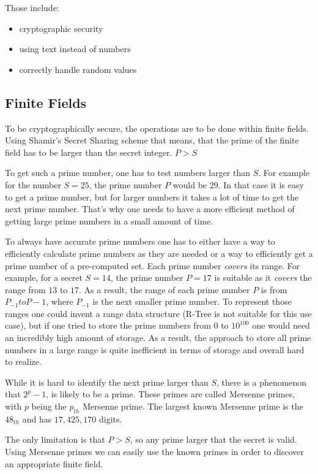 Those include:

\begin{itemize}
  \item cryptographic security
  \item using text instead of numbers
  \item correctly handle random values
\end{itemize}

\subsection{Finite Fields}

To be cryptographically secure, the operations are to be done within finite
fields. Using Shamir's Secret Sharing scheme that means, that the prime of the
finite field has to be larger than the secret integer. $P > S$

To get such a prime number, one has to test numbers larger than $S$. For example
for the number $S = 25$, the prime number $P$ would be $29$. In that case it is
easy to get a prime number, but for larger numbers it takes a lot of time to get
the next prime number. That's why one needs to have a more efficient method of
getting large prime numbers in a small amount of time.

To always have accurate prime numbers one has to either have a way to efficiently
calculate prime numbers as they are needed or a way to efficiently get a prime
number of a pre-computed set. Each prime number \textit{covers} its range. For
example, for a secret $S = 14$, the prime number $P = 17$ is suitable as it
\textit{covers} the range from $13$ to $17$. As a result, the range of each
prime number $P$ is from $P_{-1} to P-1$, where $P_{-1}$ is the next smaller
prime number. To represent those ranges one could
invent a range data structure (R-Tree is not suitable for this use case), but
if one tried to store the prime numbers from $0$ to $10^{100}$ one would need
an incredibly high amount of storage. As a result, the approach to store all
prime numbers in a large range is quite inefficient in terms of storage and
overall hard to realize.

While it is hard to identify the next prime larger than $S$, there is
a phenomenon that $2^p-1$, is likely to be a prime. These primes are called
Mersenne primes, with $p$ being the $p_{th}$ Mersenne prime. The largest known
Mersenne prime is the 48$_{th}$ and has $17,425,170$ digits.

The only limitation is that $P > S$, so any prime larger that the
secret is valid. Using Mersenne primes we can easily use the known primes in
order to discover an appropriate finite field.

